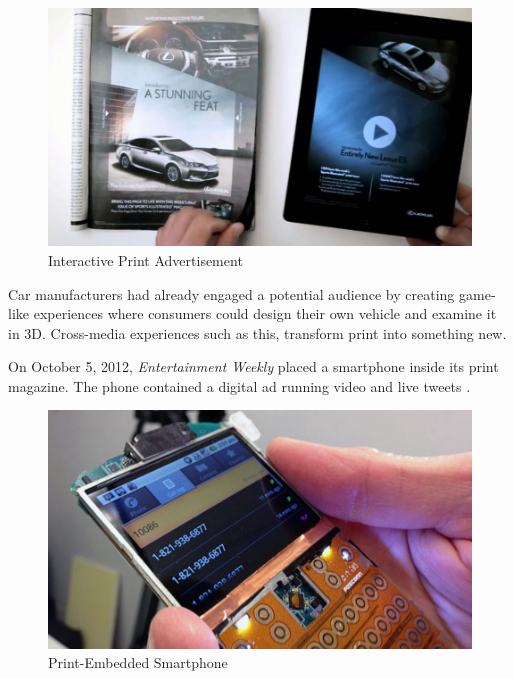 \begin{figure}
\begin{center}
 \includegraphics[scale=.50]{chapter2.tex/lexus}
\caption{Interactive Print Advertisement}
\end{center}
\end{figure}

Car manufacturers had already engaged a potential audience by creating game-like experiences where consumers could design their own vehicle and examine it in 3D. Cross-media experiences such as this, transform print into something new.

On October 5, 2012, \emph{Entertainment Weekly} placed a smartphone inside its print magazine. The phone contained a digital ad running video and live tweets  \citep{ulanoff:2013ma}. 

\begin{figure}
\begin{center}
 \includegraphics[scale=.50]{chapter2.tex/smartphone}
\caption{Print-Embedded Smartphone}
\end{center}
\end{figure}


